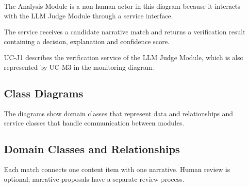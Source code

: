 \documentclass[12pt,a4paper]{article}
\begin{document}
The Analysis Module is a non-human actor in this diagram
because it interacts with the LLM Judge Module
through a service interface.

The service receives a candidate narrative match
and returns a verification result containing
a decision, explanation and confidence score.

UC-J1 describes the verification service of the LLM Judge
Module, which is also represented by UC-M3
in the monitoring diagram.


\clearpage


\begin{landscape}
\setlength{\intextsep}{6pt}
\captionsetup{skip=4pt}
\section{Class Diagrams}

The diagrams show domain classes that represent data and relationships and service classes that handle communication between modules.

\subsection{Domain Classes and Relationships}

Each match connects one content item with one narrative. Human review is
optional; narrative proposals have a separate review process.

\begin{figure}[H]
\centering
{}
\end{figure}
\end{landscape}
\end{document}
